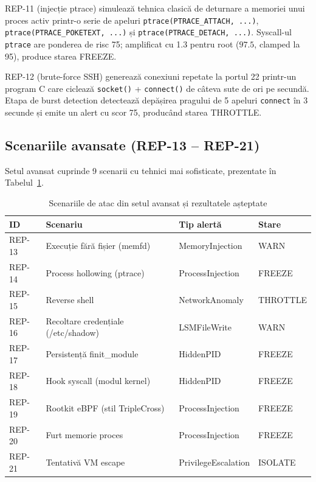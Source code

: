 \par REP-11 (injecție ptrace) simulează tehnica clasică de deturnare a memoriei unui proces activ printr-o serie de apeluri \texttt{ptrace(PTRACE\_ATTACH, ...)}, \texttt{ptrace(PTRACE\_POKETEXT, ...)} și \texttt{ptrace(PTRACE\_DETACH, ...)}. Syscall-ul \texttt{ptrace} are ponderea de risc 75; amplificat cu 1.3 pentru root ($97.5$, clamped la 95), produce starea FREEZE.

\par REP-12 (brute-force SSH) generează conexiuni repetate la portul 22 printr-un program C care ciclează \texttt{socket()} + \texttt{connect()} de câteva sute de ori pe secundă. Etapa de burst detection detectează depășirea pragului de 5 apeluri \texttt{connect} în 3 secunde și emite un alert cu scor 75, producând starea THROTTLE.

\subsection{Scenariile avansate (REP-13 -- REP-21)}
\label{subsec:advanced_attacks}

\par Setul avansat cuprinde 9 scenarii cu tehnici mai sofisticate, prezentate în Tabelul~\ref{tab:advanced_attacks}.

\begin{table}[htbp]
\begin{center}
\begin{tabular}{|p{45pt}|p{90pt}|p{95pt}|p{55pt}|}
\hline
\textbf{ID} & \textbf{Scenariu} & \textbf{Tip alertă} & \textbf{Stare} \\
\hline\hline
REP-13 & Execuție fără fișier (memfd)           & MemoryInjection     & WARN     \\
\hline
REP-14 & Process hollowing (ptrace)             & ProcessInjection    & FREEZE   \\
\hline
REP-15 & Reverse shell                          & NetworkAnomaly      & THROTTLE \\
\hline
REP-16 & Recoltare credențiale (/etc/shadow)   & LSMFileWrite        & WARN     \\
\hline
REP-17 & Persistență finit\_module              & HiddenPID           & FREEZE   \\
\hline
REP-18 & Hook syscall (modul kernel)            & HiddenPID           & FREEZE   \\
\hline
REP-19 & Rootkit eBPF (stil TripleCross)        & ProcessInjection    & FREEZE   \\
\hline
REP-20 & Furt memorie proces                   & ProcessInjection    & FREEZE   \\
\hline
REP-21 & Tentativă VM escape                   & PrivilegeEscalation & ISOLATE  \\
\hline
\end{tabular}
\end{center}
\caption{Scenariile de atac din setul avansat și rezultatele așteptate}
\label{tab:advanced_attacks}
\end{table}

